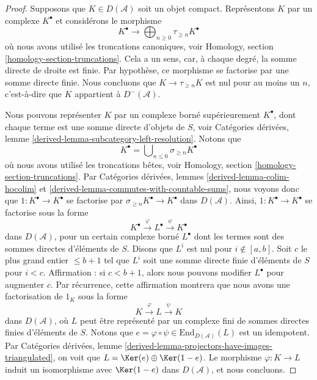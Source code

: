 \begin{proof}
Supposons que $K \in D(\mathcal{A})$ soit un objet compact. Représentons $K$
par un complexe $K^\bullet$ et considérons le morphisme
$$
K^\bullet
\longrightarrow
\bigoplus\nolimits_{n \geq 0} \tau_{\geq n} K^\bullet
$$
où nous avons utilisé les troncations canoniques, voir Homology, section
\ref{homology-section-truncations}. Cela a un sens, car, à chaque degré, la
somme directe de droite est finie. Par hypothèse, ce morphisme se factorise
par une somme directe finie. Nous concluons que
$K \to \tau_{\geq n} K$ est nul pour au moins un $n$, c'est-à-dire que $K$
appartient à $D^{-}(\mathcal{A})$.

\medskip\noindent
Nous pouvons représenter $K$ par un complexe borné supérieurement
$K^\bullet$, dont chaque terme est une somme directe d'objets de $S$, voir
Catégories dérivées, lemme \ref{derived-lemma-subcategory-left-resolution}.
Notons que
$$
K^\bullet = \bigcup\nolimits_{n \leq 0} \sigma_{\geq n}K^\bullet
$$
où nous avons utilisé les troncations bêtes, voir Homology, section
\ref{homology-section-truncations}. Par Catégories dérivées, lemmes
\ref{derived-lemma-colim-hocolim} et
\ref{derived-lemma-commutes-with-countable-sums}, nous voyons donc que
$1 : K^\bullet \to K^\bullet$ se factorise par
$\sigma_{\geq n}K^\bullet \to K^\bullet$ dans $D(\mathcal{A})$. Ainsi,
$1 : K^\bullet \to K^\bullet$ se factorise sous la forme
$$
K^\bullet \xrightarrow{\varphi} L^\bullet \xrightarrow{\psi} K^\bullet
$$
dans $D(\mathcal{A})$, pour un certain complexe borné $L^\bullet$ dont les
termes sont des sommes directes d'éléments de $S$. Disons que $L^i$ est nul
pour $i \not \in [a, b]$. Soit $c$ le plus grand entier $\leq b + 1$ tel que
$L^i$ soit une somme directe finie d'éléments de $S$ pour $i < c$.
Affirmation : si $c < b + 1$, alors nous pouvons modifier $L^\bullet$ pour
augmenter $c$. Par récurrence, cette affirmation montrera que nous avons une
factorisation de $1_K$ sous la forme
$$
K \xrightarrow{\varphi} L \xrightarrow{\psi} K
$$
dans $D(\mathcal{A})$, où $L$ peut être représenté par un complexe fini de
sommes directes finies d'éléments de $S$. Notons que
$e = \varphi \circ \psi \in \text{End}_{D(\mathcal{A})}(L)$ est un
idempotent. Par Catégories dérivées, lemme
\ref{derived-lemma-projectors-have-images-triangulated}, on voit que
$L = \Ker(e) \oplus \Ker(1 - e)$. Le morphisme $\varphi : K \to L$ induit un
isomorphisme avec $\Ker(1 - e)$ dans $D(\mathcal{A})$, et nous concluons.


\end{proof}

